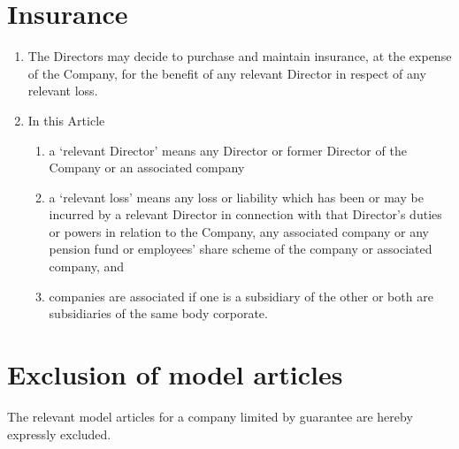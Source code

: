 \documentclass[a4paper,12pt]{article}
\renewcommand{\labelenumii}{(\alph{enumii})}
\begin{document}
\section{Insurance}

\begin{enumerate}
  \item The Directors may decide to purchase and maintain insurance, at the expense of the Company, for the benefit of any relevant Director in respect of any relevant loss.
  \item In this Article
  \begin{enumerate}
    \renewcommand{\labelenumii}{(\alph{enumii})}
    \item a `relevant Director' means any Director or former Director of the Company or an associated company
    \item a `relevant loss' means any loss or liability which has been or may be incurred by a relevant Director in connection with that Director's duties or powers in relation to the Company, any associated company or any pension fund or employees' share scheme of the company or associated company, and
    \item companies are associated if one is a subsidiary of the other or both are subsidiaries of the same body corporate.
  \end{enumerate}
\end{enumerate}

\section{Exclusion of model articles}

The relevant model articles for a company limited by guarantee are hereby expressly excluded.
\end{document}
